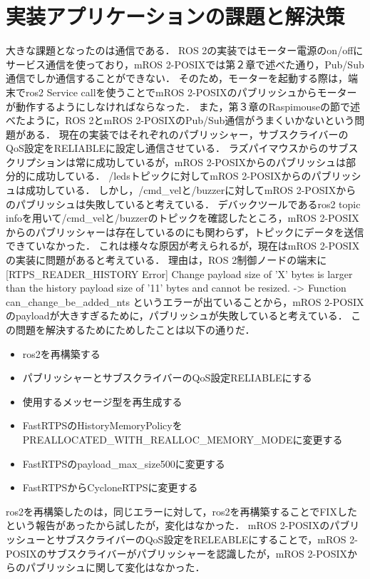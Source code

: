 \section{実装アプリケーションの課題と解決策}
大きな課題となったのは通信である．
ROS 2の実装ではモーター電源のon/offにサービス通信を使っており，mROS 2-POSIXでは第２章で述べた通り，Pub/Sub通信でしか通信することができない．
そのため，モーターを起動する際は，端末でros2 Service callを使うことでmROS 2-POSIXのパブリッシュからモーターが動作するようにしなければならなった．
また，第３章のRaspimouseの節で述べたように，ROS 2とmROS 2-POSIXのPub/Sub通信がうまくいかないという問題がある．
現在の実装ではそれぞれのパブリッシャー，サブスクライバーのQoS設定をRELIABLEに設定し通信させている．
ラズパイマウスからのサブスクリプションは常に成功しているが，mROS 2-POSIXからのパブリッシュは部分的に成功している．
/ledsトピックに対してmROS 2-POSIXからのパブリッシュは成功している．
しかし，/cmd\_velと/buzzerに対してmROS 2-POSIXからのパブリッシュは失敗していると考えている．
デバックツールであるros2 topic infoを用いて/cmd\_velと/buzzerのトピックを確認したところ，mROS 2-POSIXからのパブリッシャーは存在しているのにも関わらず，トピックにデータを送信できていなかった．
これは様々な原因が考えられるが，現在はmROS 2-POSIXの実装に問題があると考えている．
理由は，ROS 2制御ノードの端末に [RTPS\_READER\_HISTORY Error] Change payload size of 'X' bytes is larger than the history payload size of '11' bytes and cannot be resized. -> Function can\_change\_be\_added\_nts
というエラーが出ていることから，mROS 2-POSIXのpayloadが大きすぎるために，パブリッシュが失敗していると考えている．
この問題を解決するためにためしたことは以下の通りだ．
\begin{itemize}
    \item ros2を再構築する
    \item パブリッシャーとサブスクライバーのQoS設定RELIABLEにする
    \item 使用するメッセージ型を再生成する
    \item FastRTPSのHistoryMemoryPolicyをPREALLOCATED\_WITH\_REALLOC\_MEMORY\_MODEに変更する
    \item FastRTPSのpayload\_max\_size500に変更する
    \item FastRTPSからCycloneRTPSに変更する
\end{itemize}
ros2を再構築したのは，同じエラーに対して，ros2を再構築することでFIXしたという報告があったから試したが，変化はなかった．
mROS 2-POSIXのパブリッシューとサブスクライバーのQoS設定をRELEABLEにすることで，mROS 2-POSIXのサブスクライバーがパブリッシャーを認識したが，mROS 2-POSIXからのパブリッシュに関して変化はなかった．
